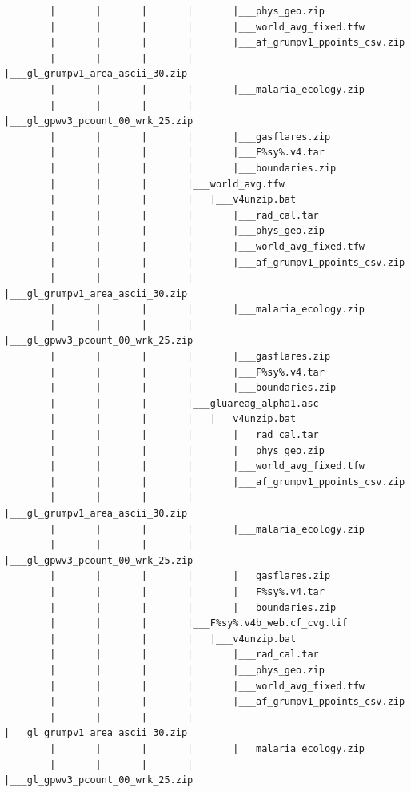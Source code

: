 \documentclass[]{book}
\begin{document}
\begin{verbatim}
        |       |       |       |       |___phys_geo.zip
        |       |       |       |       |___world_avg_fixed.tfw
        |       |       |       |       |___af_grumpv1_ppoints_csv.zip
        |       |       |       |       |___gl_grumpv1_area_ascii_30.zip
        |       |       |       |       |___malaria_ecology.zip
        |       |       |       |       |___gl_gpwv3_pcount_00_wrk_25.zip
        |       |       |       |       |___gasflares.zip
        |       |       |       |       |___F%sy%.v4.tar
        |       |       |       |       |___boundaries.zip
        |       |       |       |___world_avg.tfw
        |       |       |       |   |___v4unzip.bat
        |       |       |       |       |___rad_cal.tar
        |       |       |       |       |___phys_geo.zip
        |       |       |       |       |___world_avg_fixed.tfw
        |       |       |       |       |___af_grumpv1_ppoints_csv.zip
        |       |       |       |       |___gl_grumpv1_area_ascii_30.zip
        |       |       |       |       |___malaria_ecology.zip
        |       |       |       |       |___gl_gpwv3_pcount_00_wrk_25.zip
        |       |       |       |       |___gasflares.zip
        |       |       |       |       |___F%sy%.v4.tar
        |       |       |       |       |___boundaries.zip
        |       |       |       |___gluareag_alpha1.asc
        |       |       |       |   |___v4unzip.bat
        |       |       |       |       |___rad_cal.tar
        |       |       |       |       |___phys_geo.zip
        |       |       |       |       |___world_avg_fixed.tfw
        |       |       |       |       |___af_grumpv1_ppoints_csv.zip
        |       |       |       |       |___gl_grumpv1_area_ascii_30.zip
        |       |       |       |       |___malaria_ecology.zip
        |       |       |       |       |___gl_gpwv3_pcount_00_wrk_25.zip
        |       |       |       |       |___gasflares.zip
        |       |       |       |       |___F%sy%.v4.tar
        |       |       |       |       |___boundaries.zip
        |       |       |       |___F%sy%.v4b_web.cf_cvg.tif
        |       |       |       |   |___v4unzip.bat
        |       |       |       |       |___rad_cal.tar
        |       |       |       |       |___phys_geo.zip
        |       |       |       |       |___world_avg_fixed.tfw
        |       |       |       |       |___af_grumpv1_ppoints_csv.zip
        |       |       |       |       |___gl_grumpv1_area_ascii_30.zip
        |       |       |       |       |___malaria_ecology.zip
        |       |       |       |       |___gl_gpwv3_pcount_00_wrk_25.zip

\end{verbatim}
\end{document}
